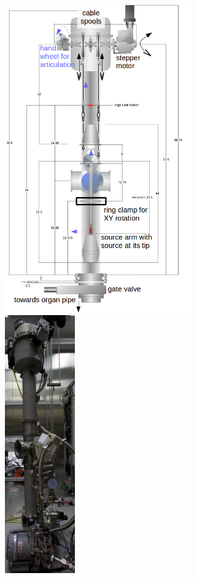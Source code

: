 \begin{figure}[htbp]
 \centering
 \includegraphics[width=0.72\textwidth]{Figures/CALISDimensions.png}
 \includegraphics[width=0.27\textwidth]{Figures/CALIS_overview_IMG_3763.jpg}

\end{figure}
